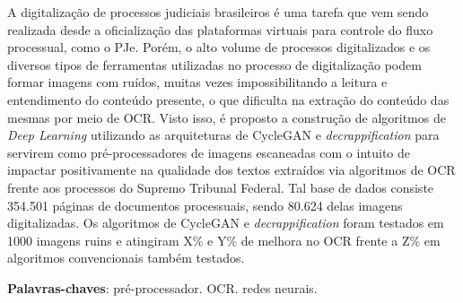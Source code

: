 \begin{resumo}
  A digitalização de processos judiciais brasileiros é uma tarefa que vem sendo realizada desde a oficialização das plataformas virtuais para controle do fluxo processual, como o PJe. Porém, o alto volume de processos digitalizados e os diversos tipos de ferramentas utilizadas no processo de digitalização podem formar imagens com ruídos, muitas vezes impossibilitando a leitura e entendimento do conteúdo presente, o que dificulta na extração do conteúdo das mesmas por meio de OCR. Visto isso, é proposto a construção de algoritmos de \textit{Deep Learning} utilizando as arquiteturas de CycleGAN e \textit{decrappification} para servirem como pré-processadores de imagens escaneadas com o intuito de impactar positivamente na qualidade dos textos extraídos via algoritmos de OCR frente aos processos do Supremo Tribunal Federal. Tal base de dados consiste 354.501 páginas de documentos processuais, sendo 80.624 delas imagens digitalizadas. Os algoritmos de CycleGAN e \textit{decrappification} foram testados em 1000 imagens ruins e atingiram X\% e Y\% de melhora no OCR frente a Z\% em algoritmos convencionais também testados.


 \vspace{\onelineskip}

 \noindent
 \textbf{Palavras-chaves}: pré-processador. OCR. redes neurais.
\end{resumo}
